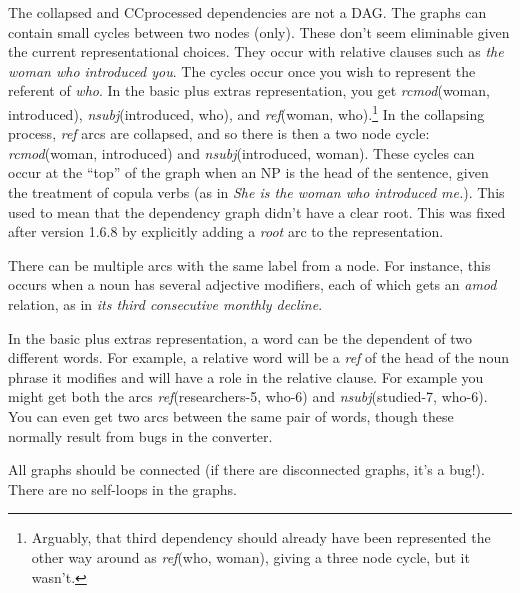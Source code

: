 \documentclass[11pt,letterpaper]{article}
\begin{document}
The collapsed and CCprocessed dependencies are not a DAG\@.
The graphs can contain small cycles between two nodes (only).
These don't seem eliminable given the current
representational choices.  They occur with relative clauses such as
\emph{the woman who introduced you}.  The cycles occur once you wish to represent the
referent of \emph{who}. In the basic plus extras
representation, you get \emph{rcmod}(woman, introduced), \emph{nsubj}(introduced, who),
and \emph{ref}(woman, who).\footnote
  {Arguably, that third dependency should already have been represented the
   other way around as \emph{ref}(who, woman), giving a three node cycle, but
   it wasn't.}
In the collapsing process, \emph{ref} arcs are collapsed, and so there is then
a two node cycle: \emph{rcmod}(woman, introduced) and \emph{nsubj}(introduced, woman).
These cycles can occur at the ``top'' of the graph when an NP is the head of the
sentence, given the treatment of copula verbs (as in \emph{She is the woman who introduced me.}). This used to
mean that the dependency graph didn't have a clear root. This was fixed after
version 1.6.8 by explicitly adding a \emph{root} arc to the representation.

There can be multiple arcs with the same label from a node.  For instance, this
occurs when a noun has several adjective modifiers, each of which gets an
\emph{amod} relation, as in \emph{its third consecutive monthly decline}.

In the basic plus extras representation, a word can be the dependent
of two different words. For example, a relative word will be a
\emph{ref} of the head of the noun phrase it modifies and will have a
role in the relative clause.  For example you might get both the arcs
\emph{ref}(researchers-5, who-6) and \emph{nsubj}(studied-7,
who-6). You can even get two arcs between the same pair of words,
though these normally result from bugs in the converter.

All graphs should be connected (if there are disconnected graphs, it's a bug!).
There are no self-loops in the graphs.
\end{document}

